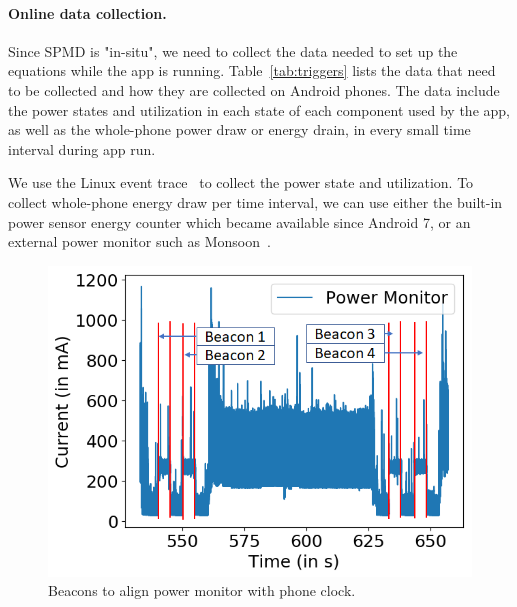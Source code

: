\paragraph{Online data collection.}
Since SPMD is "in-situ", we need to collect the data needed to set up the
equations while the app is running.
%
Table~\ref{tab:triggers} lists the data that need to be collected and
how they are collected on Android phones.  The data include the power
states and utilization in each state of each component used by the
app,
as well as the whole-phone power draw or energy drain,
\eg in every small time interval during app run.

We use the Linux event trace~\cite{eventtrace} to collect the power
state and utilization.  To collect whole-phone energy draw per
time interval, we can use either the built-in power sensor energy counter
which became available since Android {7}, or an external power
monitor such as Monsoon~\cite{monsoonpowermonitor}.


\begin{figure}[tp]
{\small
    \centering
    \includegraphics[width=0.80\columnwidth]{figures/beacons_3.png}
    \vspace{-0.1in}
    \caption{Beacons to align power monitor with phone clock.}
    \label{fig:align_beacon}
    \vspace{-0.1in}
}
\end{figure}
\fi

